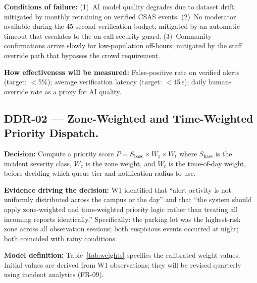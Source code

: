 \documentclass[12pt,a4paper]{article}
\begin{document}
\textbf{Conditions of failure:}
(1)~AI model quality degrades due to dataset drift; mitigated by
monthly retraining on verified CSAS events.
(2)~No moderator available during the 45-second verification budget;
mitigated by an automatic timeout that escalates to the on-call
security guard.
(3)~Community confirmations arrive slowly for low-population
off-hours; mitigated by the staff override path that bypasses the
crowd requirement.

\textbf{How effectiveness will be measured:}
False-positive rate on verified alerts (target: $<$5\%);
average verification latency (target: $<$45\,s);
daily human-override rate as a proxy for AI quality.

\subsection{DDR-02 --- Zone-Weighted and Time-Weighted Priority Dispatch.}
\label{sec:ddr02}

\textbf{Decision:} Compute a priority score
$P = S_{\text{base}} \times W_z \times W_t$
where $S_{\text{base}}$ is the incident severity class,
$W_z$ is the zone weight, and $W_t$ is the time-of-day weight,
before deciding which queue tier and notification radius to use.

\textbf{Evidence driving the decision:}
W1 identified that ``alert activity is not uniformly distributed
across the campus or the day'' and that ``the system should apply
zone-weighted and time-weighted priority logic rather than treating
all incoming reports identically.'' Specifically:
the parking lot was the highest-risk zone across all observation
sessions; both suspicious events occurred at night; both coincided
with rainy conditions.

\textbf{Model definition:}
Table~\ref{tab:weights} specifies the calibrated weight values.
Initial values are derived from W1 observations; they will be revised
quarterly using incident analytics (FR-09).
\end{document}
